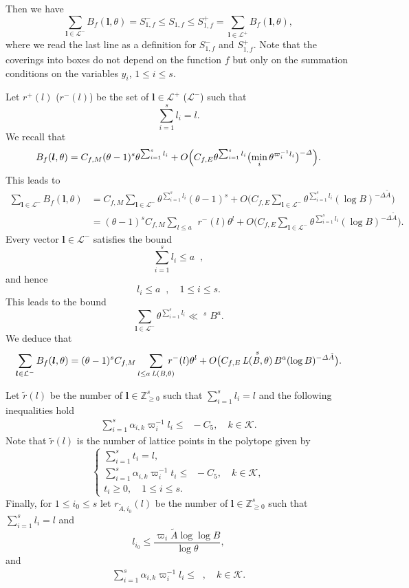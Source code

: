 \documentclass[JEP,XML,SOM,Unicode,published]{cedram}
\DeclareMathOperator{\LBt}{\mathit{L(B,\theta)}}
\let\vardel\varDelta
\let\tet\theta
\newcommand{\bfl}{\boldsymbol{l}}
\newcommand{\calK}{\mathcal{K}}
\newcommand{\calL}{\mathcal{L}}
\newcommand{\Z}{\mathbb{Z}}
\theoremstyle{definition}
\numberwithin{theorem}{section}
\begin{document}
Then we have
\[
\sum_{\bfl\in \calL^-}B_f(\bfl,\tet) = S_{1,f}^{-}\leq S_{1,f}\leq S_{1,f}^+ = \sum_{\bfl \in \calL^+}B_f(\bfl,\tet),
\]
where we read the last line as a definition for $S_{1,f}^-$ and $S_{1,f}^+$.
Note that the coverings into boxes do not depend on the function $f$ but only on the summation conditions on the variables $y_i$, $1\leq i\leq s$.\par
Let $r^+(l)$ (\resp $r^-(l)$) be the set of $\bfl\in \calL^+$ (\resp $\calL^-$) such that
\[
\sum_{i=1}^s l_i=l.
\]
We recall that
\begin{gather*}
B_f(\bfl,\tet)= C_{f,M} (\tet-1)^s \tet^{\sum_{i=1}^s l_i}+O\Bigl(C_{f,E} \tet^{\sum_{i=1}^s l_i} \bigl(\min_i \tet^{\varpi_i^{-1}l_i}\bigr)^{-\vardel}\Bigr).
\end{gather*}
This leads to
\begin{align*}
\sum_{\bfl\in \calL^-}B_f(\bfl,\tet)&=C_{f,M} \sum_{\bfl\in \calL^-} \tet^{\sum_{i=1}^s l_i} (\tet-1)^s
+O\biggl(C_{f,E} \sum_{\bfl\in \calL^-}\tet^{\sum_{i=1}^s l_i} (\log B)^{-\vardel \tilde{A}}\biggr)
\\
&= (\tet -1)^s C_{f,M} \sum_{l\leq a \LBt} r^-(l) \tet^l
+O\biggl(C_{f,E} \sum_{\bfl\in \calL^-}\tet^{\sum_{i=1}^s l_i} (\log B)^{-\vardel \tilde{A}}\biggr).
\end{align*}
Every vector $\bfl\in \calL^-$ satisfies the bound
\[
\sum_{i=1}^s l_i \leq a \LBt,
\]
and hence
\[
l_i \leq a \LBt, \quad 1\leq i\leq s.
\]
This leads to the bound
\[
\sum_{\bfl\in \calL^-}\tet^{\sum_{i=1}^s l_i}\ll \LBt^s B^{a}.
\]
We deduce that
\[
\sum_{\bfl\in \calL^-}B_f(\bfl,\tet)=(\tet -1)^s C_{f,M} \sum_{l\leq a \LBt}\hspace*{-3mm} r^-(l) \tet^l 
+O\bigl(C_{f,E} \LBt^s B^{a} (\log B)^{-\vardel \tilde{A}}\bigr).
\]

Let $\tilde{r}(l)$ be the number of $\bfl\in \Z_{\geq 0}^s$ such that $\sum_{i=1}^s l_i=l$ and the following inequalities hold
\begin{gather*}
\sum_{i=1}^s \alpha_{i,k} \varpi_i^{-1}l_i \leq \LBt- C_5 ,\quad k\in \calK.
\end{gather*}
Note that $\tilde{r}(l)$ is the number of lattice points in the polytope given by
\[
\begin{cases}
\sum_{i=1}^s t_i=l,\\
\sum_{i=1}^s \alpha_{i,k} \varpi_i^{-1}t_i \leq \LBt - C_5,\quad k\in \calK,\\
t_i\geq 0,\quad 1\leq i\leq s.
\end{cases}
\]
Finally, for $1\leq i_0\leq s$ let $r_{\tilde{A}, i_0}(l)$ be the number of $\bfl\in \Z_{\geq 0}^s$ such that $\sum_{i=1}^s l_i=l$ and
\[
l_{i_0} \leq \frac{\varpi_i \tilde{A} \log \log B}{\log \tet},
\]
and
\begin{gather*}
\sum_{i=1}^s \alpha_{i,k} \varpi_i^{-1}l_i \leq \LBt,\quad k\in \calK.
\end{gather*}
\end{document}
